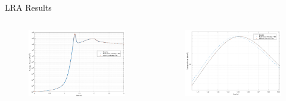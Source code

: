 \documentclass[8pt]{beamer}
\begin{document}
\begin{frame}{LRA Results}

\begin{columns}

\begin{figure}
\includegraphics[width=\linewidth]{figures/LRA_DT2.png}
\end{figure}

\begin{figure}
\includegraphics[width=\linewidth]{figures/LRA_DT2_peak.png}
\end{figure}

\end{columns}


\end{frame}
\end{document}
